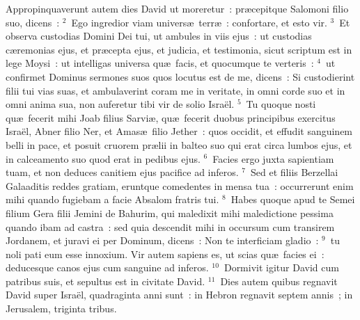 \bchapter
\lettrine[lines=3,image=true,loversize=0.05,lraise=-0.03]{A}{}ppropinquaverunt autem dies David ut moreretur~: pr\ae cepitque Salomoni filio suo, dicens~:
${}^{2}$~Ego ingredior viam univers\ae\ terr\ae~: confortare, et esto vir.
${}^{3}$~Et observa custodias Domini Dei tui, ut ambules in viis ejus~: ut custodias c\ae remonias ejus, et pr\ae cepta ejus, et judicia, et testimonia, sicut scriptum est in lege Moysi~: ut intelligas universa qu\ae\ facis, et quocumque te verteris~:
${}^{4}$~ut confirmet Dominus sermones suos quos locutus est de me, dicens~: Si custodierint filii tui vias suas, et ambulaverint coram me in veritate, in omni corde suo et in omni anima sua, non auferetur tibi vir de solio Isra\"el.
${}^{5}$~Tu quoque nosti qu\ae\ fecerit mihi Joab filius Sarvi\ae , qu\ae\ fecerit duobus principibus exercitus Isra\"el, Abner filio Ner, et Amas\ae\ filio Jether~: quos occidit, et effudit sanguinem belli in pace, et posuit cruorem pr\ae lii in balteo suo qui erat circa lumbos ejus, et in calceamento suo quod erat in pedibus ejus.
${}^{6}$~Facies ergo juxta sapientiam tuam, et non deduces canitiem ejus pacifice ad inferos.
${}^{7}$~Sed et filiis Berzellai Galaaditis reddes gratiam, eruntque comedentes in mensa tua~: occurrerunt enim mihi quando fugiebam a facie Absalom fratris tui.
${}^{8}$~Habes quoque apud te Semei filium Gera filii Jemini de Bahurim, qui maledixit mihi maledictione pessima quando ibam ad castra~: sed quia descendit mihi in occursum cum transirem Jordanem, et juravi ei per Dominum, dicens~: Non te interficiam gladio~:
${}^{9}$~tu noli pati eum esse innoxium. Vir autem sapiens es, ut scias qu\ae\ facies ei~: deducesque canos ejus cum sanguine ad inferos.
${}^{10}$~Dormivit igitur David cum patribus suis, et sepultus est in civitate David.
${}^{11}$~Dies autem quibus regnavit David super Isra\"el, quadraginta anni sunt~: in Hebron regnavit septem annis~; in Jerusalem, triginta tribus.



